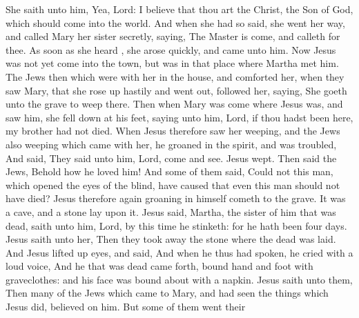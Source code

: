 {{}
She
saith unto
him,
Yea,
Lord:
I
believe
that
thou
art the
Christ, the
Son of
God, which should
come
into the
world.
And when she
had
so
said, she went her
way,
and
called
Mary
her
sister
secretly,
saying, The
Master is
come,
and
calleth for
thee.
As soon
as
she
heard
{}, she
arose
quickly,
and
came
unto
him.
Now
Jesus
was not
yet
come
into the
town,
but
was
in that
place
where
Martha
met
him.
The
Jews
then which
were
with
her
in the
house,
and
comforted
her, when they
saw
Mary,
that she rose
up
hastily
and went
out,
followed
her,
saying, She
goeth
unto the
grave
to
weep
there.
Then
when
Mary was
come
where
Jesus
was, and
saw
him, she fell
down
at
his
feet,
saying unto
him,
Lord,
if thou hadst
been
here,
my
brother
had
not
died.
When
Jesus
therefore
saw
her
weeping,
and the
Jews
also
weeping which
came with
her,
he
groaned in the
spirit,
and was
troubled,
And
said,
{} They
said unto
him,
Lord,
come
and
see.
Jesus
wept.
Then
said the
Jews,
Behold
how he
loved
him!
And
some
of
them
said,
Could
not this
man, which
opened the
eyes of the
blind, have
caused
that
even this
man
should
not have
died?
Jesus
therefore
again
groaning
in
himself
cometh
to the
grave. It
was a
cave,
and a
stone
lay
upon
it.
Jesus
said,
{}
Martha, the
sister of him that was
dead,
saith unto
him,
Lord, by this
time he
stinketh:
for he hath
been
{} four
days.
Jesus
saith unto
her,
{}
Then they took
away the
stone
{}
where the
dead
was
laid.
And
Jesus
lifted
up
{}
eyes,
and
said,
{}
And when
he
thus had
spoken, he
cried with
a
loud
voice,
{}
And he that was
dead came
forth,
bound
hand
and
foot
with
graveclothes:
and
his
face was bound about
with a
napkin.
Jesus
saith unto
them,
{}
Then
many
of the
Jews which
came
to
Mary,
and had
seen the things
which
Jesus
did,
believed
on
him.
But
some
of
them went their
}
